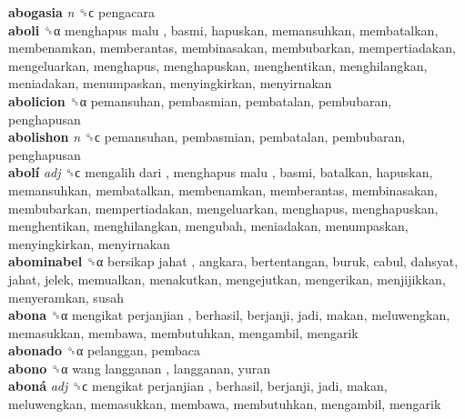 \textbf{abogasia} \emph{n}  ␝ϲ  pengacara  \\
\textbf{aboli} ␝α   menghapus malu , basmi, hapuskan, memansuhkan, membatalkan, membenamkan, memberantas, membinasakan, membubarkan, mempertiadakan, mengeluarkan, menghapus, menghapuskan, menghentikan, menghilangkan, meniadakan, menumpaskan, menyingkirkan, menyirnakan  \\
\textbf{abolicion} ␝α  pemansuhan, pembasmian, pembatalan, pembubaran, penghapusan  \\
\textbf{abolishon} \emph{n}  ␝ϲ  pemansuhan, pembasmian, pembatalan, pembubaran, penghapusan  \\
\textbf{abolí} \emph{adj}  ␝ϲ   mengalih dari ,  menghapus malu , basmi, batalkan, hapuskan, memansuhkan, membatalkan, membenamkan, memberantas, membinasakan, membubarkan, mempertiadakan, mengeluarkan, menghapus, menghapuskan, menghentikan, menghilangkan, mengubah, meniadakan, menumpaskan, menyingkirkan, menyirnakan  \\
\textbf{abominabel} ␝α   bersikap jahat , angkara, bertentangan, buruk, cabul, dahsyat, jahat, jelek, memualkan, menakutkan, mengejutkan, mengerikan, menjijikkan, menyeramkan, susah  \\
\textbf{abona} ␝α   mengikat perjanjian , berhasil, berjanji, jadi, makan, meluwengkan, memasukkan, membawa, membutuhkan, mengambil, mengarik  \\
\textbf{abonado} ␝α  pelanggan, pembaca  \\
\textbf{abono} ␝α   wang langganan , langganan, yuran  \\
\textbf{aboná} \emph{adj}  ␝ϲ   mengikat perjanjian , berhasil, berjanji, jadi, makan, meluwengkan, memasukkan, membawa, membutuhkan, mengambil, mengarik  \\
